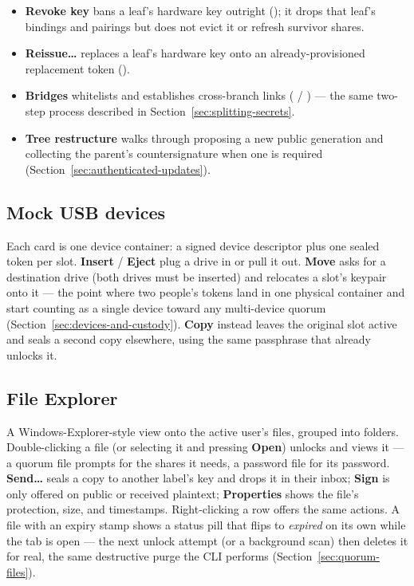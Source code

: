 \begin{itemize}
  \item \textbf{Revoke key} bans a leaf's hardware key outright
  (); it drops that leaf's bindings and pairings but
  does not evict it or refresh survivor shares.
  \item \textbf{Reissue\ldots} replaces a leaf's hardware key onto an
  already-provisioned replacement token ().
  \item \textbf{Bridges} whitelists and establishes cross-branch links
  ( / ) --- the same two-step process
  described in Section~\ref{sec:splitting-secrets}.
  \item \textbf{Tree restructure} walks through proposing a new public
  generation and collecting the parent's countersignature when one is
  required (Section~\ref{sec:authenticated-updates}).
\end{itemize}

\subsection{Mock USB devices}

Each card is one device container: a signed device descriptor plus one
sealed token per slot. \textbf{Insert} / \textbf{Eject} plug a drive in or
pull it out. \textbf{Move} asks for a destination drive (both drives must
be inserted) and relocates a slot's keypair onto it --- the point where two
people's tokens land in one physical container and start counting as a
single device toward any multi-device quorum
(Section~\ref{sec:devices-and-custody}). \textbf{Copy} instead leaves the
original slot active and seals a second copy elsewhere, using the same
passphrase that already unlocks it.

\subsection{File Explorer}

A Windows-Explorer-style view onto the active user's files, grouped into
folders. Double-clicking a file (or selecting it and pressing
\textbf{Open}) unlocks and views it --- a quorum file prompts for the
shares it needs, a password file for its password. \textbf{Send\ldots}
seals a copy to another label's key and drops it in their inbox;
\textbf{Sign} is only offered on public or received plaintext;
\textbf{Properties} shows the file's protection, size, and timestamps.
Right-clicking a row offers the same actions. A file with an expiry stamp
shows a status pill that flips to \emph{expired} on its own while the tab
is open --- the next unlock attempt (or a background scan) then deletes it
for real, the same destructive purge the CLI performs
(Section~\ref{sec:quorum-files}).

